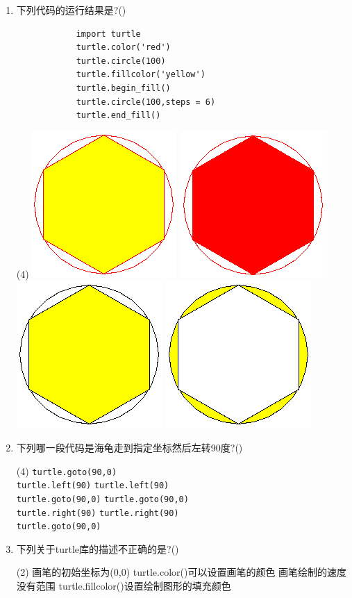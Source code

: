 \documentclass[11pt]{ctexart}
\begin{document}
\begin{enumerate}
        \item 下列代码的运行结果是?(\qquad)
        \begin{lstlisting}
            import turtle
            turtle.color('red')
            turtle.circle(100)
            turtle.fillcolor('yellow')
            turtle.begin_fill()
            turtle.circle(100,steps = 6)
            turtle.end_fill()
        \end{lstlisting}
        \begin{tasks}(4)
            \task \includegraphics[width=.1\textwidth]{11a.png}
            \task \includegraphics[width=.1\textwidth]{11b.png}
            \task \includegraphics[width=.1\textwidth]{11c.png}
            \task \includegraphics[width=.1\textwidth]{11d.png}
        \end{tasks}

        \item 下列哪一段代码是海龟走到指定坐标然后左转90度?(\qquad)
        \begin{tasks}(4)
            \task \lstinline!turtle.goto(90,0)! \\ \lstinline!turtle.left(90)!
            \task \lstinline!turtle.left(90)! \\ \lstinline!turtle.goto(90,0)!
            \task \lstinline!turtle.goto(90,0)! \\ \lstinline!turtle.right(90)!
            \task \lstinline!turtle.right(90)! \\ \lstinline!turtle.goto(90,0)!
        \end{tasks}

        \item 下列关于turtle库的描述不正确的是?(\qquad)
        \begin{tasks}(2)
            \task 画笔的初始坐标为(0,0)
            \task turtle.color()可以设置画笔的颜色
            \task 画笔绘制的速度没有范围
            \task turtle.fillcolor()设置绘制图形的填充颜色
        \end{tasks}


\end{enumerate}
\end{document}
